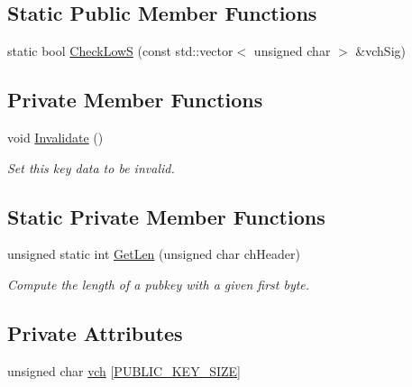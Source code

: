 \subsection*{Static Public Member Functions}
\begin{DoxyCompactItemize}
\item 
static bool \mbox{\hyperlink{class_c_pub_key_a4ada230ef593456ef9088c28fd5ca34e}{Check\+LowS}} (const std\+::vector$<$ unsigned char $>$ \&vch\+Sig)
\end{DoxyCompactItemize}
\subsection*{Private Member Functions}
\begin{DoxyCompactItemize}
\item 
void \mbox{\hyperlink{class_c_pub_key_a99917e80a362af54a3677ea9cf1328ee}{Invalidate}} ()
\begin{DoxyCompactList}\small\item\em Set this key data to be invalid. \end{DoxyCompactList}\end{DoxyCompactItemize}
\subsection*{Static Private Member Functions}
\begin{DoxyCompactItemize}
\item 
unsigned static int \mbox{\hyperlink{class_c_pub_key_a7dc71b3f037c84268dc22de97d7b65fb}{Get\+Len}} (unsigned char ch\+Header)
\begin{DoxyCompactList}\small\item\em Compute the length of a pubkey with a given first byte. \end{DoxyCompactList}\end{DoxyCompactItemize}
\subsection*{Private Attributes}
\begin{DoxyCompactItemize}
\item 
unsigned char \mbox{\hyperlink{class_c_pub_key_a9a55b20ad79b45f3430b4e316a2c48d4}{vch}} \mbox{[}\mbox{\hyperlink{pubkey_8h_ab921d367fa7639df1a3bc22f8acbe9f4}{P\+U\+B\+L\+I\+C\+\_\+\+K\+E\+Y\+\_\+\+S\+I\+ZE}}\mbox{]}
\end{DoxyCompactItemize}
